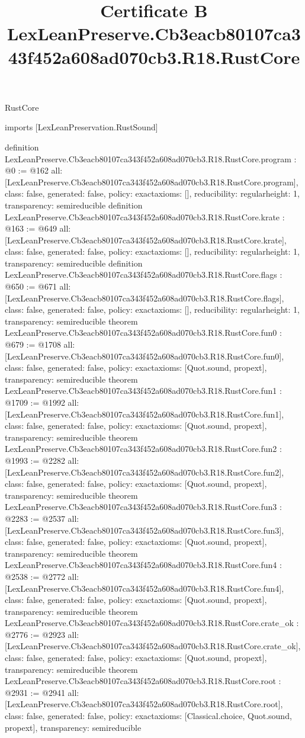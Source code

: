 \begin{lexlean}{RustCore}
\title{Certificate B LexLeanPreserve.Cb3eacb80107ca343f452a608ad070cb3.R18.RustCore}
\begin{coremodule}
imports [LexLeanPreservation.RustSound]

definition LexLeanPreserve.Cb3eacb80107ca343f452a608ad070cb3.R18.RustCore.program : @0 := @162 {
  all: [LexLeanPreserve.Cb3eacb80107ca343f452a608ad070cb3.R18.RustCore.program],
  class: false,
  generated: false,
  policy: exact{axioms: []},
  reducibility: regular{height: 1},
  transparency: semireducible
}
definition LexLeanPreserve.Cb3eacb80107ca343f452a608ad070cb3.R18.RustCore.krate : @163 := @649 {
  all: [LexLeanPreserve.Cb3eacb80107ca343f452a608ad070cb3.R18.RustCore.krate],
  class: false,
  generated: false,
  policy: exact{axioms: []},
  reducibility: regular{height: 1},
  transparency: semireducible
}
definition LexLeanPreserve.Cb3eacb80107ca343f452a608ad070cb3.R18.RustCore.flags : @650 := @671 {
  all: [LexLeanPreserve.Cb3eacb80107ca343f452a608ad070cb3.R18.RustCore.flags],
  class: false,
  generated: false,
  policy: exact{axioms: []},
  reducibility: regular{height: 1},
  transparency: semireducible
}
theorem LexLeanPreserve.Cb3eacb80107ca343f452a608ad070cb3.R18.RustCore.fun0 : @679 := @1708 {
  all: [LexLeanPreserve.Cb3eacb80107ca343f452a608ad070cb3.R18.RustCore.fun0],
  class: false,
  generated: false,
  policy: exact{axioms: [Quot.sound, propext]},
  transparency: semireducible
}
theorem LexLeanPreserve.Cb3eacb80107ca343f452a608ad070cb3.R18.RustCore.fun1 : @1709 := @1992 {
  all: [LexLeanPreserve.Cb3eacb80107ca343f452a608ad070cb3.R18.RustCore.fun1],
  class: false,
  generated: false,
  policy: exact{axioms: [Quot.sound, propext]},
  transparency: semireducible
}
theorem LexLeanPreserve.Cb3eacb80107ca343f452a608ad070cb3.R18.RustCore.fun2 : @1993 := @2282 {
  all: [LexLeanPreserve.Cb3eacb80107ca343f452a608ad070cb3.R18.RustCore.fun2],
  class: false,
  generated: false,
  policy: exact{axioms: [Quot.sound, propext]},
  transparency: semireducible
}
theorem LexLeanPreserve.Cb3eacb80107ca343f452a608ad070cb3.R18.RustCore.fun3 : @2283 := @2537 {
  all: [LexLeanPreserve.Cb3eacb80107ca343f452a608ad070cb3.R18.RustCore.fun3],
  class: false,
  generated: false,
  policy: exact{axioms: [Quot.sound, propext]},
  transparency: semireducible
}
theorem LexLeanPreserve.Cb3eacb80107ca343f452a608ad070cb3.R18.RustCore.fun4 : @2538 := @2772 {
  all: [LexLeanPreserve.Cb3eacb80107ca343f452a608ad070cb3.R18.RustCore.fun4],
  class: false,
  generated: false,
  policy: exact{axioms: [Quot.sound, propext]},
  transparency: semireducible
}
theorem LexLeanPreserve.Cb3eacb80107ca343f452a608ad070cb3.R18.RustCore.crate_ok : @2776 := @2923 {
  all: [LexLeanPreserve.Cb3eacb80107ca343f452a608ad070cb3.R18.RustCore.crate_ok],
  class: false,
  generated: false,
  policy: exact{axioms: [Quot.sound, propext]},
  transparency: semireducible
}
theorem LexLeanPreserve.Cb3eacb80107ca343f452a608ad070cb3.R18.RustCore.root : @2931 := @2941 {
  all: [LexLeanPreserve.Cb3eacb80107ca343f452a608ad070cb3.R18.RustCore.root],
  class: false,
  generated: false,
  policy: exact{axioms: [Classical.choice, Quot.sound, propext]},
  transparency: semireducible
}


\end{coremodule}
\end{lexlean}
